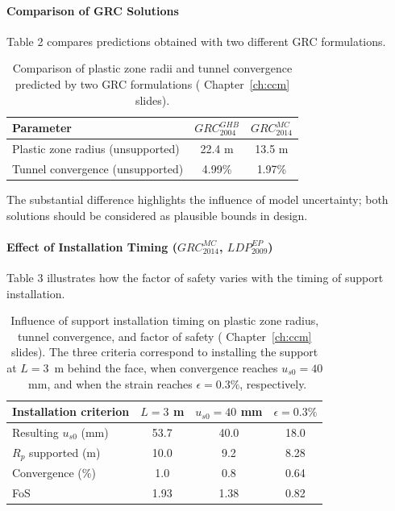 \paragraph{Comparison of GRC Solutions}
Table 2 compares predictions obtained with two different GRC formulations.

\begin{table}[h!]
\centering
\begin{tabular}{lcc}
\toprule
\textbf{Parameter} & \textbf{$GRC_{2004}^{GHB}$} & \textbf{$GRC_{2014}^{MC}$} \\
\midrule
Plastic zone radius (unsupported) & 22.4 m & 13.5 m \\
Tunnel convergence (unsupported) & 4.99\% & 1.97\% \\
\bottomrule
\end{tabular}
\caption{Comparison of plastic zone radii and tunnel convergence predicted by two GRC formulations ( Chapter~\ref{ch:ccm} slides).}
\end{table}

The substantial difference highlights the influence of model uncertainty; both solutions should be considered as plausible bounds in design.

\paragraph{Effect of Installation Timing ($GRC_{2014}^{MC}$, $LDP_{2009}^{EP}$)}
Table 3 illustrates how the factor of safety varies with the timing of support installation.

\begin{table}[h!]
\centering
\begin{tabular}{lccc}
\toprule
\textbf{Installation criterion} & $L = 3$ m & $u_{s0} = 40$ mm & $\epsilon = 0.3\%$ \\
\midrule
Resulting $u_{s0}$ (mm) & 53.7 & 40.0 & 18.0 \\
$R_p$ supported (m) & 10.0 & 9.2 & 8.28 \\
Convergence (\%) & 1.0 & 0.8 & 0.64 \\
FoS & 1.93 & 1.38 & 0.82 \\
\bottomrule
\end{tabular}
\caption{Influence of support installation timing on plastic zone radius, tunnel convergence, and factor of safety ( Chapter~\ref{ch:ccm} slides). The three criteria correspond to installing the support at $L=3$~m behind the face, when convergence reaches $u_{s0}=40$~mm, and when the strain reaches $\epsilon=0.3\%$, respectively.}
\end{table}

